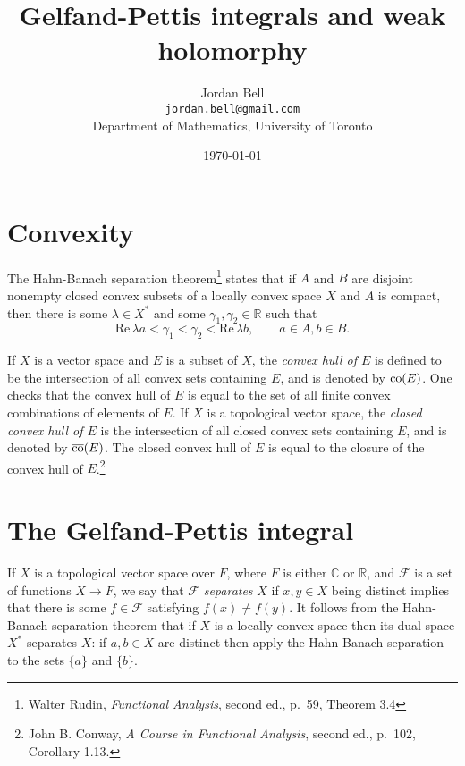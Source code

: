 \documentclass{article}
\def\Re{\ensuremath{\mathrm{Re}}\,}
\newcommand{\co}{\ensuremath\mathrm{co}}
\newcommand{\cco}{\overline{\ensuremath\mathrm{co}}}
\theoremstyle{definition}
\begin{document}
\title{Gelfand-Pettis integrals and weak holomorphy}
\author{Jordan Bell\\ \texttt{jordan.bell@gmail.com}\\Department of Mathematics, University of Toronto}
\date{\today}

\maketitle



\section{Convexity}
The Hahn-Banach separation theorem\footnote{Walter Rudin, {\em Functional Analysis}, second ed., p.~59,
Theorem 3.4} states that if $A$ and $B$ are disjoint nonempty closed convex subsets of a  locally convex space
$X$ and $A$ is compact, then there is some $\lambda \in X^*$ and some $\gamma_1,\gamma_2 \in \mathbb{R}$ such that
\[
\Re \lambda  a < \gamma_1 < \gamma_2< \Re \lambda b, \qquad a \in A,  b\in B.
\]

If $X$ is a vector space and $E$ is a subset of $X$, the {\em convex hull of $E$} is defined to be the intersection of all
convex sets containing $E$, and is denoted  by $\co(E)$. One checks that the convex hull of $E$ is equal to the set of all finite convex combinations of elements
of $E$. 
If $X$ is a topological vector space, 
the {\em closed convex hull of $E$} is the intersection of all
closed convex sets containing $E$, and is denoted by $\cco(E)$. The closed convex hull of $E$ is equal to the closure of the convex hull of $E$.\footnote{John
B. Conway, {\em A Course in Functional Analysis}, second ed., p.~102, Corollary 1.13.}


\section{The Gelfand-Pettis integral}
If $X$ is a topological vector space over $F$, where $F$ is either $\mathbb{C}$ or $\mathbb{R}$,
 and $\mathscr{F}$ is a set of
functions $X \to F$, we say that $\mathscr{F}$ {\em separates} $X$ if $x,y \in X$ being distinct implies that there is some
$f \in \mathscr{F}$ satisfying $f(x) \neq f(y)$. 
It follows from the Hahn-Banach separation theorem
that if $X$ is a locally convex space then its dual space $X^*$ separates $X$: if $a,b \in X$ are distinct then apply the Hahn-Banach separation to the sets
$\{a\}$ and $\{b\}$.
\end{document}
